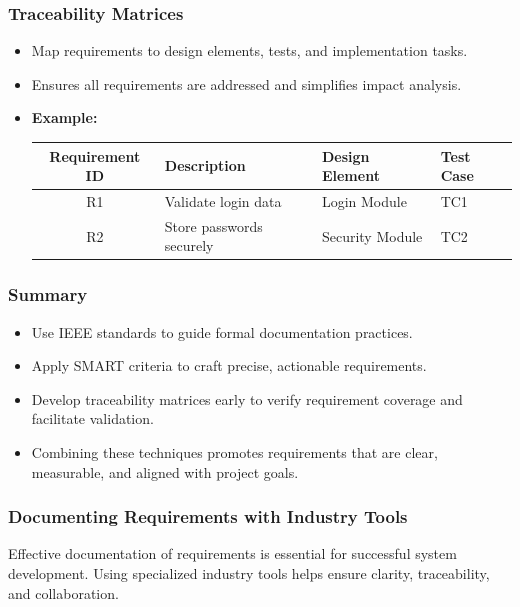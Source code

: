 \documentclass{beamer}
\begin{document}
\begin{frame}[fragile]
    \frametitle{Traceability Matrices}
    \begin{itemize}
        \item Map requirements to design elements, tests, and implementation tasks.
        \item Ensures all requirements are addressed and simplifies impact analysis.
        \item \textbf{Example:}
        \begin{tabular}{|c|l|l|l|}
            \hline
            Requirement ID & Description & Design Element & Test Case \\
            \hline
            R1 & Validate login data & Login Module & TC1 \\
            R2 & Store passwords securely & Security Module & TC2 \\
            \hline
        \end{tabular}
    \end{itemize}
\end{frame}

\begin{frame}[fragile]
    \frametitle{Summary}
    \begin{itemize}
        \item Use IEEE standards to guide formal documentation practices.
        \item Apply SMART criteria to craft precise, actionable requirements.
        \item Develop traceability matrices early to verify requirement coverage and facilitate validation.
        \item Combining these techniques promotes requirements that are clear, measurable, and aligned with project goals.
    \end{itemize}
\end{frame}

\begin{frame}[fragile]
    \frametitle{Documenting Requirements with Industry Tools}
    Effective documentation of requirements is essential for successful system development. Using specialized industry tools helps ensure clarity, traceability, and collaboration.
\end{frame}
\end{document}
